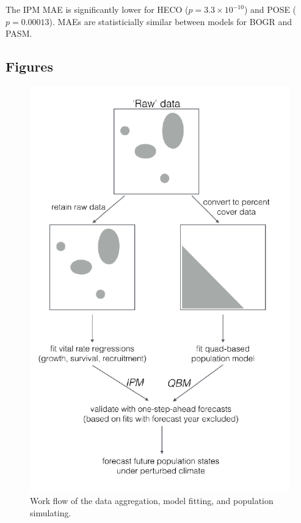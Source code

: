 \documentclass[12pt,]{article}
\begin{document}
The IPM MAE is significantly lower for HECO ($p = 3.3 \times 10^{-10}$)
and POSE ($p = 0.00013$). MAEs are statisticially similar between models
for BOGR and PASM.

\pagebreak{}

\pagebreak{}

\subsection{Figures}\label{figures}

\begin{figure}[htbp]
\centering
\includegraphics{components/figure/manuscript-figure_1.pdf}
\caption{Work flow of the data aggregation, model fitting, and
population simulating.}
\end{figure}
\end{document}
